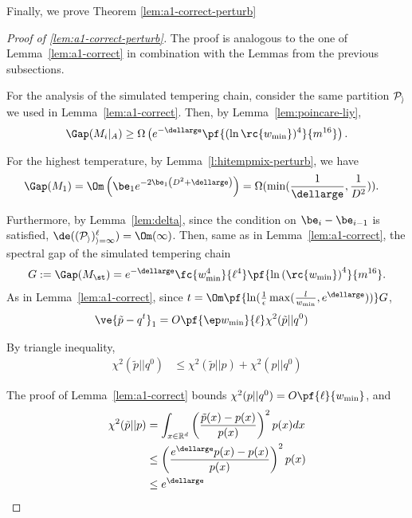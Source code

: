 Finally, we prove Theorem \ref{lem:a1-correct-perturb}
\begin{proof}[Proof of \ref{lem:a1-correct-perturb}] 
 
The proof is analogous to the one of Lemma~\ref{lem:a1-correct} in combination with the Lemmas from the previous subsections. 

For the analysis of the simulated tempering chain, consider the same partition $\cal P_i$ we used in Lemma~\ref{lem:a1-correct}. 
Then, by Lemma~\ref{lem:poincare-liy}, 
\begin{align}
\Gap(M_{i}|_A) \ge \Omega \left( e^{-\dellarge}\pf{(\ln \rc{w_{\min}})^4}{m^{16}} \right).
\end{align} 

For the highest temperature, by Lemma~\ref{l:hitempmix-perturb}, we have
\begin{align}
\Gap(M_1) &=\Om\left(\be_1 e^{-2\be_1 \left(D^2 + \dellarge\right)}\right) = \Omega(\min(\frac{1}{\dellarge},\frac{1}{D^2})). 
\end{align}

Furthermore, by Lemma~\ref{lem:delta}, since the condition on $\be_i-\be_{i-1}$ is satisfied, $\de((\cal P_i)_{i=1}^\ell)=\Om(1)$. Then, same as in Lemma~\ref{lem:a1-correct}, the spectral gap of the simulated tempering chain 
\begin{align}
G:=\Gap(M_{\st}) =  e^{-\dellarge} \fc{w_{\min}^4}{\ell^4}\pf{{\ln \left( \rc{w_{\min}}\right)}^4}{m^{16}}.
\end{align}
As in Lemma~\ref{lem:a1-correct}, since $t=\Om\pf{\ln (\frac{1}{\epsilon} \max(\frac{l}{w_{\min}}, e^{\dellarge}))}G$, 
\begin{align}\label{eq:chi-sq-final}
\ve{\tilde{p}-q^t}_1&= O\pf{\ep w_{\min}}{\ell}\chi^2(\tilde{p}||q^0)
\end{align}

By triangle inequality,  
\begin{align*} 
\chi^2(\tilde{p}||q^0) &\leq \chi^2(\tilde{p}||p) + \chi^2(p||q^0)
\end{align*}  

The proof of Lemma~\ref{lem:a1-correct} bounds $\chi^2(p||q^0) = O\pf{\ell}{w_{\min}} $, and 
\begin{align*} \chi^2(\tilde{p}||p) &= \int_{x \in \mathbb{R}^d} \left( \frac{\tilde{p}(x) - p(x)}{p(x)} \right)^2 p(x) dx \\ 
&\leq \left( \frac{e^{\dellarge} p(x) - p(x)}{p(x)} \right)^2 p(x)  \\ 
&\leq e^{\dellarge} \end{align*}


\end{proof}
